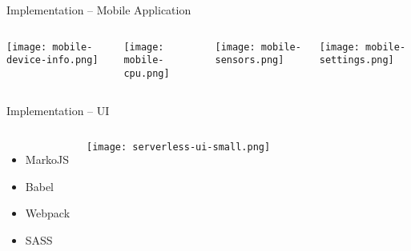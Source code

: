 \begin{frame}{Implementation -- Mobile Application}
  \begin{columns}
    \vfill
    \vspace*{2em}
    \centering
    \texttt{[image: mobile-device-info.png]}

    \vfill
    \vspace*{2em}
    \centering
    \texttt{[image: mobile-cpu.png]}

    \vfill
    \vspace*{2em}
    \centering
    \texttt{[image: mobile-sensors.png]}

    \vfill
    \vspace*{2em}
    \centering
    \texttt{[image: mobile-settings.png]}
  \end{columns}
\end{frame}

\begin{frame}{Implementation -- UI}
  \begin{columns}
      \begin{itemize}
        \item MarkoJS
        \item Babel
        \item Webpack
        \item SASS
      \end{itemize}
      \vfill
      \centering
      \texttt{[image: serverless-ui-small.png]}
   \end{columns}
\end{frame}
